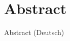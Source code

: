 %
\chapter*{Abstract}
\label{sec:abstract}
\vspace*{-10mm}


\vspace*{20mm}

{Abstract (Deutsch)}\label{sec:abstract-diff} \\

